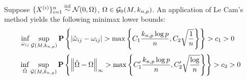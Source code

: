 \begin{frame}[fragile] \frametitle{}

    \vspace{0.5cm}
    Suppose $\{X^{(i)}\}_{i=1}^n \stackrel{\mathrm{iid}}{\sim} \mathcal{N}(0, \Omega)$, $\Omega \in \mathcal{G}_0(M,
    k_{n, p})$.  An application of Le Cam's method yields the following minimax
    lower bounds:
    \vspace{0.2cm}
    $$
    \hspace{-0.5cm}
    \inf_{\hat\omega_{ij}} \sup_{\Gg(M, k_{n, p})}
    \PP\left\{
    |\hat\omega_{ij} - \omega_{ij}| > \max\left\{
    C_1\frac{k_{n, p}\log p}{n}, C_2 \sqrt\frac{1}{n}
    \right\}
    \right\} > c_1 > 0
    $$
    $$
    \hspace{-0.2cm}
    \inf_{\hat\Omega} \sup_{\Gg(M, k_{n, p})}
    \PP\left\{
        \norm{\hat\Omega - \Omega}_\infty > \max\left\{
    C_1'\frac{k_{n, p}\log p}{n}, C_2' \sqrt\frac{\log}{n}
    \right\}
    \right\} > c_2 > 0
    $$
    
\end{frame}
\begin{frame}[fragile] \frametitle{}
\end{frame}
\begin{frame}[fragile] \frametitle{}
\end{frame}


